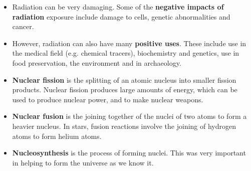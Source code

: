 \begin{itemize}
\item{Radiation can be very damaging. Some of the \textbf{negative impacts of radiation} exposure include damage to cells, genetic abnormalities and cancer.}
\item{However, radiation can also have many \textbf{positive uses}. These include use in the medical field (e.g. chemical tracers), biochemistry and genetics, use in food preservation, the environment and in archaeology.}
\item{\textbf{Nuclear fission} is the splitting of an atomic nucleus into smaller fission products. Nuclear fission produces large amounts of energy, which can be used to produce nuclear power, and to make nuclear weapons.}
\item{\textbf{Nuclear fusion} is the joining together of the nuclei of two atoms to form a heavier nucleus. In stars, fusion reactions involve the joining of hydrogen atoms to form helium atoms.}
\item{\textbf{Nucleosynthesis} is the process of forming nuclei. This was very important in helping to form the universe as we know it.}
\end{itemize}


